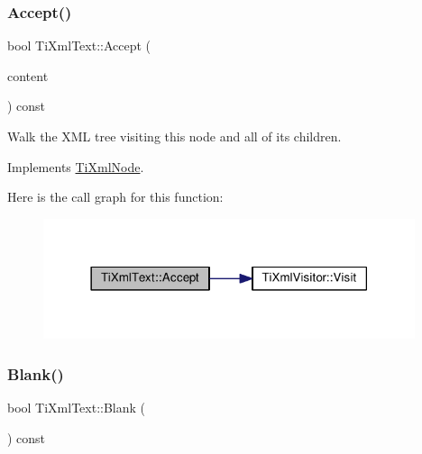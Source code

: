 \subsubsection{\texorpdfstring{Accept()}{Accept()}}
{\footnotesize\ttfamily bool Ti\+Xml\+Text\+::\+Accept (\begin{DoxyParamCaption}\item[{\hyperlink{class_ti_xml_visitor}{Ti\+Xml\+Visitor} $\ast$}]{content }\end{DoxyParamCaption}) const\hspace{0.3cm}{\ttfamily [virtual]}}

Walk the X\+ML tree visiting this node and all of its children. 

Implements \hyperlink{class_ti_xml_node_acc0f88b7462c6cb73809d410a4f5bb86}{Ti\+Xml\+Node}.

Here is the call graph for this function\+:
\nopagebreak
\begin{figure}[H]
\begin{center}
\leavevmode
\includegraphics[width=309pt]{class_ti_xml_text_af65964326eac4640bfb97d4622fa0de2_cgraph}
\end{center}
\end{figure}
\mbox{\label{class_ti_xml_text_a0fd9005b279def46859b72f336b158da}} 
\subsubsection{\texorpdfstring{Blank()}{Blank()}}
{\footnotesize\ttfamily bool Ti\+Xml\+Text\+::\+Blank (\begin{DoxyParamCaption}{ }\end{DoxyParamCaption}) const\hspace{0.3cm}{\ttfamily [protected]}}

